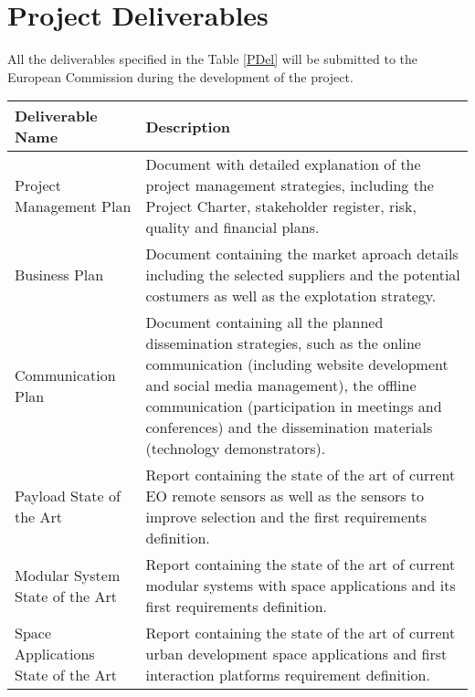 \section{Project Deliverables}

All the deliverables specified in the Table \ref{PDel} will be submitted to the European Commission during the development of the project. 

\begin{longtable}[H]{>{\raggedright\arraybackslash}p{4cm} p{10cm}}
	
	\toprule[2pt]
	
	\textbf{Deliverable Name} & \textbf{Description} \\ 
	
	\midrule[1.5pt] 
	\endhead
	
	
	Project Management Plan & 
	Document with detailed explanation of the project management strategies, including the Project Charter, stakeholder register, risk, quality and financial plans. 
	\vspace{0.2cm}
	\\ \midrule

	Business Plan & 
	Document containing the market aproach details including the selected suppliers and the potential costumers as well as the explotation strategy. 
	\vspace{0.2cm}
	\\ \midrule
	
	Communication Plan  & 
	Document containing all the planned dissemination strategies, such as the online communication (including website development and social media management), the offline communication (participation in meetings and conferences) and the dissemination materials (technology demonstrators). 
	\vspace{0.2cm}
	\\ \midrule

	Payload State of the Art  & 
	Report containing the state of the art of current EO remote sensors as well as the sensors to improve selection and the first requirements definition.  
	\vspace{0.2cm}
	\\ \midrule

	Modular System State of the Art  & 
	Report containing the state of the art of current modular systems with space applications and its first requirements definition.  
	\vspace{0.2cm}
	\\ \midrule

	Space Applications State of the Art & 
	Report containing the state of the art of current urban development space applications and first interaction platforms requirement definition.  
	\vspace{0.2cm}
	\\ \midrule


\end{longtable}
